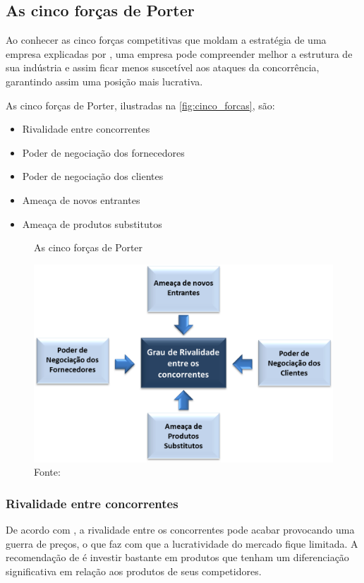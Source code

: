 \subsection{As cinco forças de Porter}
\label{cinco_forças_porter}
Ao conhecer as cinco forças competitivas que moldam a estratégia de uma empresa explicadas por , uma empresa pode compreender melhor a estrutura de sua indústria e assim ficar menos suscetível aos ataques da concorrência, garantindo assim uma posição mais lucrativa.

As cinco forças de Porter, ilustradas na \autoref{fig:cinco_forcas}, são:
\begin{itemize}
\item Rivalidade entre concorrentes
\item Poder de negociação dos fornecedores
\item Poder de negociação dos clientes
\item Ameaça de novos entrantes
\item Ameaça de produtos substitutos
\end{itemize}

\begin{figure}[H]
\caption{As cinco forças de Porter}
\centerline{\includegraphics[scale=0.6]{img/cinco_forcas}}
\label{fig:cinco_forcas}
\caption* {Fonte: }
\end{figure}

\subsubsection{Rivalidade entre concorrentes}
\label{rivalidade_entre_concorrentes}
De acordo com , a rivalidade entre os concorrentes pode acabar provocando uma guerra de preços, o que faz com que a lucratividade do mercado fique limitada. A recomendação de  é investir bastante em produtos que tenham um diferenciação significativa em relação aos produtos de seus competidores. 

